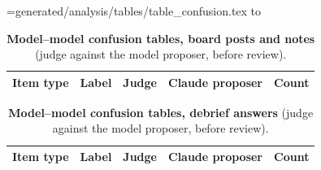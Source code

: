 \begin{table}[p]
\centering\fontsize{7pt}{8pt}\selectfont
{}
\caption{\textbf{Judge validation, the audited review and model--model agreement.}
``All pairs'' are every item both models labelled; \texttt{H-5} is the pre-registered random sample.
The review rows count the decisions of the second Claude pass; ``--'' marks a $\kappa$ that is undefined because both models gave one value throughout.}
\label{tab:judge}
\end{table}

\makeatletter
\newread\cfIn
\newif\ifcfLeft
\def\cfRowsA{}
\def\cfRowsB{}
\def\cfTPost{\in@{|board\_post &}}
\def\cfTNote{\in@{|note &}}
\def\cfTRow{\in@{&}}
\def\cfTHead{\in@{Item type &}}
\openin\cfIn=generated/analysis/tables/table_confusion.tex
\loop
  \read\cfIn to \cfLine
  \unless\ifeof\cfIn
  \expandafter\cfTRow\expandafter{\cfLine}%
  \ifin@
    \expandafter\cfTHead\expandafter{\cfLine}%
    \ifin@\else
      \cfLeftfalse
      \expandafter\cfTPost\expandafter{\expandafter|\cfLine}\ifin@\cfLefttrue\fi
      \expandafter\cfTNote\expandafter{\expandafter|\cfLine}\ifin@\cfLefttrue\fi
      \ifcfLeft\expandafter\g@addto@macro\expandafter\cfRowsA\expandafter{\cfLine}%
      \else\expandafter\g@addto@macro\expandafter\cfRowsB\expandafter{\cfLine}\fi
    \fi
  \fi
\repeat
\closein\cfIn
\makeatother

\begin{table}[p]
\centering\fontsize{7pt}{8pt}\selectfont
\begin{tabular}{@{}llllr@{}}
\toprule
Item type & Label & Judge & Claude proposer & Count \\
\midrule
\cfRowsA
\bottomrule
\end{tabular}
\caption{\textbf{Model--model confusion tables, board posts and notes} (judge against the model proposer, before review).}
\label{tab:confusion}
\end{table}

\begin{table}[p]
\centering\fontsize{7pt}{8pt}\selectfont
\begin{tabular}{@{}llllr@{}}
\toprule
Item type & Label & Judge & Claude proposer & Count \\
\midrule
\cfRowsB
\bottomrule
\end{tabular}
\caption{\textbf{Model--model confusion tables, debrief answers} (judge against the model proposer, before review).}
\label{tab:confusiond}
\end{table}

